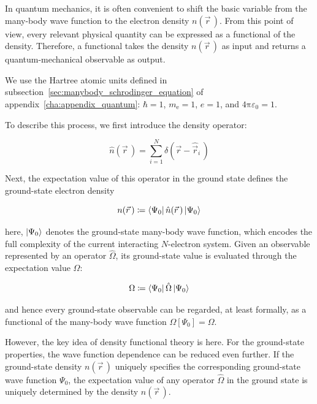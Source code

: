 In quantum mechanics, it is often convenient to shift the basic variable from the many-body wave function to the electron density $n(\vec{r}\,)$.
From this point of view, every relevant physical quantity can be expressed as a functional of the density.
Therefore, a functional takes the density $n(\vec{r}\,)$ as input and returns a quantum-mechanical observable as output.

We use the Hartree atomic units defined in subsection~\ref{sec:manybody_schrodinger_equation} of appendix~\ref{cha:appendix_quantum}:
$\hbar=1$, $m_\mathrm{e}=1$, $e=1$, and $4\mathrm{\pi}\varepsilon_0=1$.

To describe this process, we first introduce the density operator:

\begin{equation}
    \hat{n}(\vec{r}\,) = \sum_{i=1}^N \delta(\vec{r}-\hat{\vec{r}}_i\,)
\label{density_operator}
\end{equation}

Next, the expectation value of this operator in the ground state defines the ground-state electron density

\begin{equation}
    n(\vec{r}\,)\coloneqq\bra{\Psi_0}\hat{n}(\vec{r}\,)\ket{\Psi_0}
\label{electron_density_definition}
\end{equation}

here, $\ket{\Psi_0}$ denotes the ground-state many-body wave function, which encodes the full complexity of the current interacting $N$-electron system.
Given an observable represented by an operator $\hat{\Omega}$, its ground-state value is evaluated through the expectation value $\Omega$:

\begin{equation}
    \Omega \coloneqq \bra{\Psi_0}\hat{\Omega}\ket{\Psi_0}
\label{electron_density_expectation}
\end{equation}

and hence every ground-state observable can be regarded, at least formally, as a functional of the many-body wave function $\Omega[\Psi_0]=\Omega$.

However, the key idea of density functional theory is here.
For the ground-state properties, the wave function dependence can be reduced even further.
If the ground-state density $n(\vec{r}\,)$ uniquely specifies the corresponding ground-state wave function $\Psi_0$,
the expectation value of any operator $\hat{\Omega}$ in the ground state is uniquely determined by the density $n(\vec{r}\,)$.

